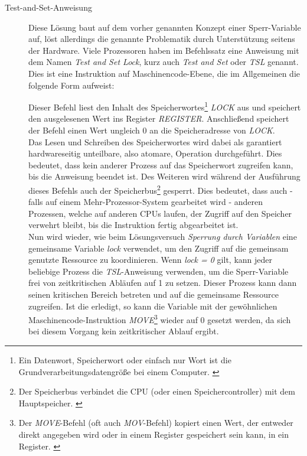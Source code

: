 \begin{description}
\begin{description}
							\item[Test-and-Set-Anweisung]
							
								Diese Lösung baut auf dem vorher genannten Konzept einer Sperr-Variable auf, löst allerdings die genannte Problematik durch Unterstützung seitens der Hardware. Viele Prozessoren haben im Befehlssatz eine Anweisung mit dem Namen \textit{Test and Set Lock}, kurz auch \textit{Test and Set} oder \textit{TSL} genannt. Dies ist eine Instruktion auf Maschinencode-Ebene, die im Allgemeinen die folgende Form aufweist:
								
								
								
								Dieser Befehl liest den Inhalt des Speicherwortes\footnote{Ein Datenwort, Speicherwort oder einfach nur Wort ist die Grundverarbeitungsdatengröße bei einem Computer. \cite{DatenwortWikipedia}} \textit{LOCK} aus und speichert den ausgelesenen Wert ins Register \textit{REGISTER}. Anschließend speichert der Befehl einen Wert ungleich 0 an die Speicheradresse von \textit{LOCK}.\\
								Das Lesen und Schreiben des Speicherwortes wird dabei als garantiert hardwareseitig unteilbare, also atomare, Operation durchgeführt. Dies bedeutet, dass kein anderer Prozess auf das Speicherwort zugreifen kann, bis die Anweisung beendet ist. Des Weiteren wird während der Ausführung dieses Befehls auch der Speicherbus\footnote{Der Speicherbus verbindet die CPU (oder einen Speichercontroller) mit dem Hauptspeicher. \cite{SpeicherbusWikibooks}} gesperrt. Dies bedeutet, dass auch - falls auf einem Mehr-Prozessor-System gearbeitet wird - anderen Prozessen, welche auf anderen CPUs laufen, der Zugriff auf den Speicher verwehrt bleibt, bis die Instruktion fertig abgearbeitet ist.\\
								Nun wird wieder, wie beim Lösungsversuch \textit{Sperrung durch Variablen} eine gemeinsame Variable \textit{lock} verwendet, um den Zugriff auf die gemeinsam genutzte Ressource zu koordinieren. Wenn \textit{lock = 0} gilt, kann jeder beliebige Prozess die \textit{TSL}-Anweisung verwenden, um die Sperr-Variable frei von zeitkritischen Abläufen auf 1 zu setzen. Dieser Prozess kann dann seinen kritischen Bereich betreten und auf die gemeinsame Ressource zugreifen. Ist die erledigt, so kann die Variable mit der gewöhnlichen Maschinencode-Instruktion \textit{MOVE}\footnote{Der \textit{MOVE}-Befehl (oft auch \textit{MOV}-Befehl) kopiert einen Wert, der entweder direkt angegeben wird oder in einem Register gespeichert sein kann, in ein Register. \cite{MoveBefehlWikibooks}} wieder auf 0 gesetzt werden, da sich bei diesem Vorgang kein zeitkritischer Ablauf ergibt.\\

\end{description}
\end{description}
